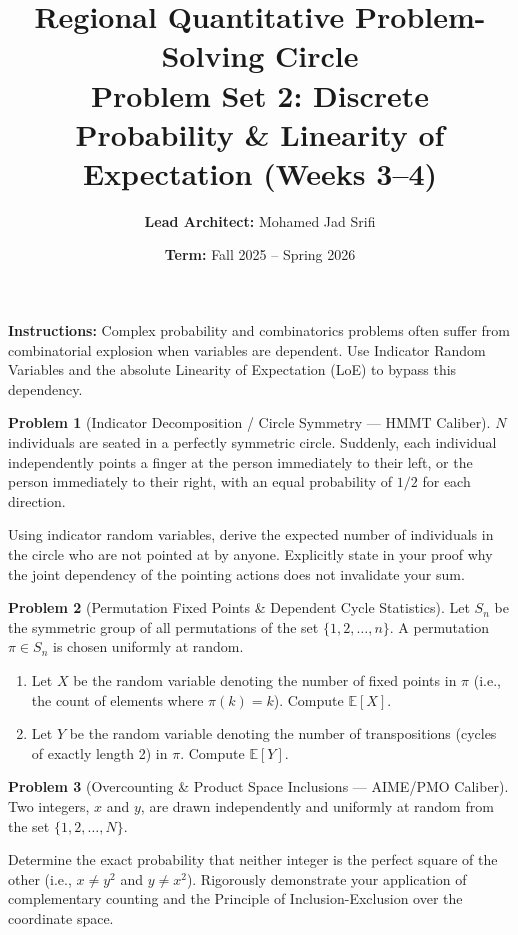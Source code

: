 \documentclass[11pt, a4paper]{article}
\theoremstyle{definition}
\newtheorem{problem}{Problem}
\begin{document}
\title{\vspace{-1.5cm}\textbf{Regional Quantitative Problem-Solving Circle} \\ \Large Problem Set 2: Discrete Probability \& Linearity of Expectation (Weeks 3--4)}
\author{\textbf{Lead Architect:} Mohamed Jad Srifi}
\date{\textbf{Term:} Fall 2025 -- Spring 2026}
\maketitle

\noindent\textbf{Instructions:} Complex probability and combinatorics problems often suffer from combinatorial explosion when variables are dependent. Use Indicator Random Variables and the absolute Linearity of Expectation (LoE) to bypass this dependency.

\vspace{0.5cm}

\begin{problem}[Indicator Decomposition / Circle Symmetry --- HMMT Caliber]
$N$ individuals are seated in a perfectly symmetric circle. Suddenly, each individual independently points a finger at the person immediately to their left, or the person immediately to their right, with an equal probability of $1/2$ for each direction.

Using indicator random variables, derive the expected number of individuals in the circle who are not pointed at by anyone. Explicitly state in your proof why the joint dependency of the pointing actions does not invalidate your sum.
\end{problem}

\vspace{0.5cm}

\begin{problem}[Permutation Fixed Points \& Dependent Cycle Statistics]
Let $S_n$ be the symmetric group of all permutations of the set $\{1, 2, \dots, n\}$. A permutation $\pi \in S_n$ is chosen uniformly at random.
\begin{enumerate}
    \item Let $X$ be the random variable denoting the number of fixed points in $\pi$ (i.e., the count of elements where $\pi(k) = k$). Compute $\mathbb{E}[X]$.
    \item Let $Y$ be the random variable denoting the number of transpositions (cycles of exactly length 2) in $\pi$. Compute $\mathbb{E}[Y]$.
\end{enumerate}
\end{problem}

\vspace{0.5cm}

\begin{problem}[Overcounting \& Product Space Inclusions --- AIME/PMO Caliber]
Two integers, $x$ and $y$, are drawn independently and uniformly at random from the set $\{1, 2, \dots, N\}$. 

Determine the exact probability that neither integer is the perfect square of the other (i.e., $x \neq y^2$ and $y \neq x^2$). Rigorously demonstrate your application of complementary counting and the Principle of Inclusion-Exclusion over the coordinate space.
\end{problem}
\end{document}
